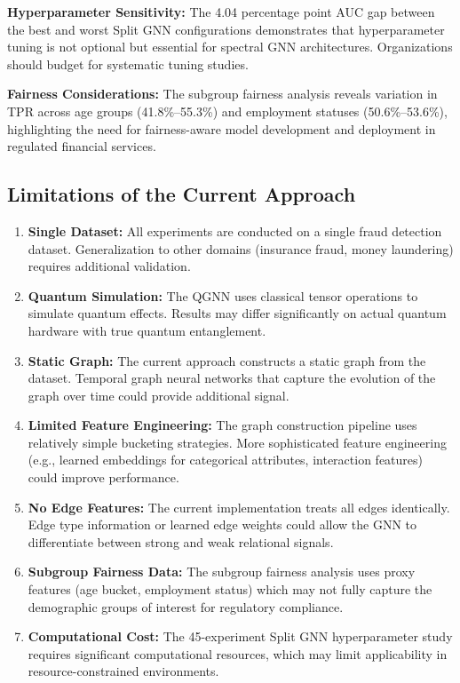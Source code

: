 \textbf{Hyperparameter Sensitivity:} The 4.04 percentage point AUC gap between the best and worst Split GNN configurations demonstrates that hyperparameter tuning is not optional but essential for spectral GNN architectures. Organizations should budget for systematic tuning studies.

\textbf{Fairness Considerations:} The subgroup fairness analysis reveals variation in TPR across age groups (41.8\%--55.3\%) and employment statuses (50.6\%--53.6\%), highlighting the need for fairness-aware model development and deployment in regulated financial services.

\subsection{Limitations of the Current Approach}

\begin{enumerate}[label=\arabic*.]
\item \textbf{Single Dataset:} All experiments are conducted on a single fraud detection dataset. Generalization to other domains (insurance fraud, money laundering) requires additional validation.
\item \textbf{Quantum Simulation:} The QGNN uses classical tensor operations to simulate quantum effects. Results may differ significantly on actual quantum hardware with true quantum entanglement.
\item \textbf{Static Graph:} The current approach constructs a static graph from the dataset. Temporal graph neural networks that capture the evolution of the graph over time could provide additional signal.
\item \textbf{Limited Feature Engineering:} The graph construction pipeline uses relatively simple bucketing strategies. More sophisticated feature engineering (e.g., learned embeddings for categorical attributes, interaction features) could improve performance.
\item \textbf{No Edge Features:} The current implementation treats all edges identically. Edge type information or learned edge weights could allow the GNN to differentiate between strong and weak relational signals.
\item \textbf{Subgroup Fairness Data:} The subgroup fairness analysis uses proxy features (age bucket, employment status) which may not fully capture the demographic groups of interest for regulatory compliance.
\item \textbf{Computational Cost:} The 45-experiment Split GNN hyperparameter study requires significant computational resources, which may limit applicability in resource-constrained environments.
\end{enumerate}
